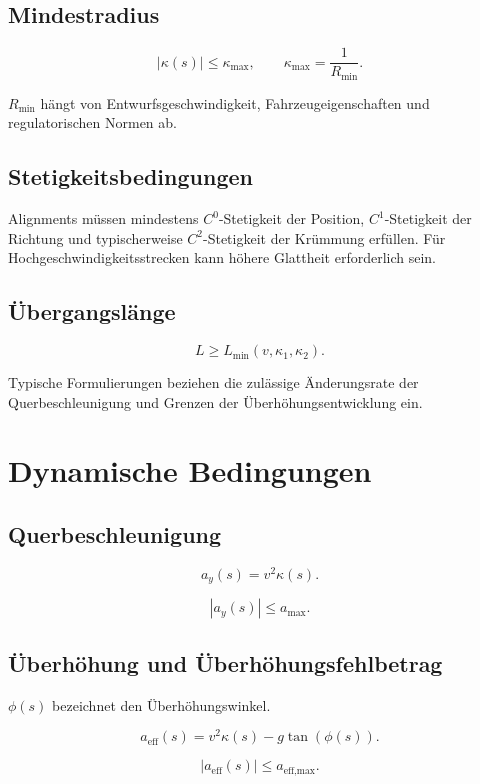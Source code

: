 \subsection{Mindestradius}
\begin{definition}[Mindestradiusbedingung]
\[
|\kappa(s)|\leq\kappa_{\max},\qquad\kappa_{\max}=\frac1{R_{\min}}.
\]
\end{definition}
\(R_{\min}\) hängt von Entwurfsgeschwindigkeit, Fahrzeugeigenschaften und
regulatorischen Normen ab.

\subsection{Stetigkeitsbedingungen}
Alignments müssen mindestens \(C^0\)-Stetigkeit der Position,
\(C^1\)-Stetigkeit der Richtung und typischerweise \(C^2\)-Stetigkeit der
Krümmung erfüllen. Für Hochgeschwindigkeitsstrecken kann höhere Glattheit
erforderlich sein.

\subsection{Übergangslänge}
\begin{definition}
\[
L\geq L_{\min}(v,\kappa_1,\kappa_2).
\]
\end{definition}
Typische Formulierungen beziehen die zulässige Änderungsrate der
Querbeschleunigung und Grenzen der Überhöhungsentwicklung ein.

\section{Dynamische Bedingungen}
\subsection{Querbeschleunigung}
\begin{definition}[Querbeschleunigung]
\[a_y(s)=v^2\kappa(s).\]
\end{definition}
\begin{constraint}\[|a_y(s)|\leq a_{\max}.\]\end{constraint}

\subsection{Überhöhung und Überhöhungsfehlbetrag}
\begin{definition}[Überhöhungswinkel]
\(\phi(s)\) bezeichnet den Überhöhungswinkel.
\end{definition}
\begin{definition}
\[
a_{\text{eff}}(s)=v^2\kappa(s)-g\tan(\phi(s)).
\]
\end{definition}
\begin{constraint}\[|a_{\text{eff}}(s)|\leq a_{\text{eff,max}}.\]\end{constraint}

